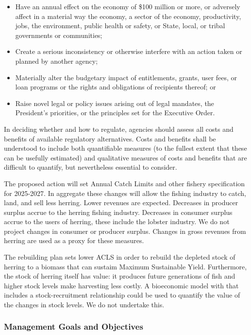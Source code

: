\documentclass[
  12pt,
]{article}
\providecommand{\tightlist}{%
  \setlength{\itemsep}{0pt}\setlength{\parskip}{0pt}}
\begin{document}
\begin{itemize}
\tightlist
\item
  Have an annual effect on the economy of \$100 million or more, or
  adversely affect in a material way the economy, a sector of the
  economy, productivity, jobs, the environment, public health or safety,
  or State, local, or tribal governments or communities;
\item
  Create a serious inconsistency or otherwise interfere with an action
  taken or planned by another agency;
\item
  Materially alter the budgetary impact of entitlements, grants, user
  fees, or loan programs or the rights and obligations of recipients
  thereof; or
\item
  Raise novel legal or policy issues arising out of legal mandates, the
  President's priorities, or the principles set for the Executive Order.
\end{itemize}

In deciding whether and how to regulate, agencies should assess all
costs and benefits of available regulatory alternatives. Costs and
benefits shall be understood to include both quantifiable measures (to
the fullest extent that these can be usefully estimated) and qualitative
measures of costs and benefits that are difficult to quantify, but
nevertheless essential to consider.

The proposed action will set Annual Catch Limits and other fishery
specification for 2025-2027. In aggregate these changes will allow the
fishing industry to catch, land, and sell less herring. Lower revenues
are expected. Decreases in producer surplus accrue to the herring
fishing industry. Decreases in consumer surplus accrue to the users of
herring, these include the lobster industry. We do not project changes
in consumer or producer surplus. Changes in gross revenues from herring
are used as a proxy for these measures.

The rebuilding plan sets lower ACLS in order to rebuild the depleted
stock of herring to a biomass that can sustaim Maximum Sustainable
Yield. Furthermore, the stock of herring itself has value: it produces
future generations of fish and higher stock levels make harvesting less
costly. A bioeconomic model with that includes a stock-recruitment
relationship could be used to quantify the value of the changes in stock
levels. We do not undertake this.

\hypertarget{management-goals-and-objectives}{%
\subsubsection{Management Goals and
Objectives}\label{management-goals-and-objectives}}
\end{document}
